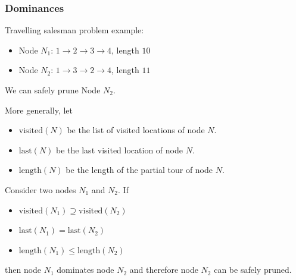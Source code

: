 \documentclass[10pt]{beamer}
\begin{document}
\begin{frame}
  \frametitle{Dominances}

  Travelling salesman problem example:
  \begin{itemize}
    \item Node $N_1$: $1 \to 2 \to 3 \to 4$, length $10$
    \item Node $N_2$: $1 \to 3 \to 2 \to 4$, length $11$
  \end{itemize}

  We can safely prune Node $N_2$.

  \pause

  \bigskip

  More generally, let
  \begin{itemize}
    \item $\mathrm{visited}(N)$ be the list of visited locations of node $N$.
    \item $\mathrm{last}(N)$ be the last visited location of node $N$.
    \item $\mathrm{length}(N)$ be the length of the partial tour of node $N$.
  \end{itemize}

  Consider two nodes $N_1$ and $N_2$.
  If
  \begin{itemize}
    \item $\mathrm{visited}(N_1) \supseteq \mathrm{visited}(N_2)$
    \item $\mathrm{last}(N_1) = \mathrm{last}(N_2)$
    \item $\mathrm{length}(N_1) \le \mathrm{length}(N_2)$
  \end{itemize}
  then node $N_1$ dominates node $N_2$ and therefore node $N_2$ can be safely pruned.
\end{frame}
\end{document}

